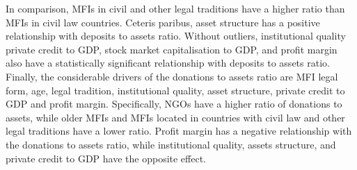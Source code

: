 \documentclass[a4paper, nobind]{templates/ociamthesis}
\begin{document}
In comparison, MFIs in civil and other legal traditions have a higher ratio than MFIs in civil law countries. Ceteris paribus, asset structure has a positive relationship with deposits to assets ratio. Without outliers, institutional quality private credit to GDP, stock market capitalisation to GDP, and profit margin also have a statistically significant relationship with deposits to assets ratio. Finally, the considerable drivers of the donations to assets ratio are MFI legal form, age, legal tradition, institutional quality, asset structure, private credit to GDP and profit margin. Specifically, NGOs have a higher ratio of donations to assets, while older MFIs and MFIs located in countries with civil law and other legal traditions have a lower ratio. Profit margin has a negative relationship with the donations to assets ratio, while institutional quality, assets structure, and private credit to GDP have the opposite effect.
\end{document}
